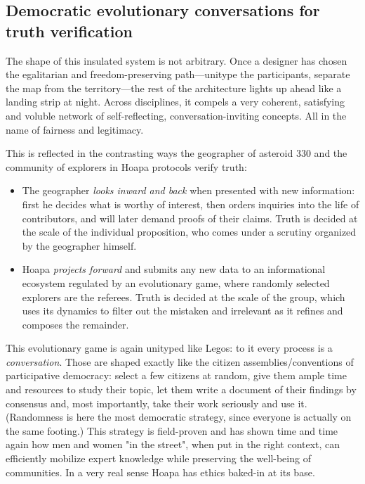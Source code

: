 \documentclass[11pt]{article}
\begin{document}
\subsection{Democratic evolutionary conversations for truth verification}

The shape of this insulated system is not arbitrary. Once a designer has chosen the egalitarian and freedom-preserving path---unitype the participants, separate the map from the territory---the rest of the architecture lights up ahead like a landing strip at night. Across disciplines, it compels a very coherent, satisfying and voluble network of self-reflecting, conversation-inviting concepts. All in the name of fairness and legitimacy.

This is reflected in the contrasting ways the geographer of asteroid 330 and the community of explorers in Hoapa protocols verify truth:

\begin{itemize}

\item The geographer \emph{looks inward and back} when presented with new information: first he decides what is worthy of interest, then orders inquiries into the life of contributors, and will later demand proofs of their claims. Truth is decided at the scale of the individual proposition, who comes under a scrutiny organized by the geographer himself.

\item Hoapa \emph{projects forward} and submits any new data to an informational ecosystem regulated by an evolutionary game, where randomly selected explorers are the referees. Truth is decided at the scale of the group, which uses its dynamics to filter out the mistaken and irrelevant as it refines and composes the remainder.

\end{itemize}

This evolutionary game is again unityped like Legos: to it every process is a \emph{conversation}. Those are shaped exactly like the citizen assemblies/conventions of participative democracy: select a few citizens at random, give them ample time and resources to study their topic, let them write a document of their findings by consensus and, most importantly, take their work seriously and use it. (Randomness is here the most democratic strategy, since everyone is actually on the same footing.) This strategy is field-proven and has shown time and time again how men and women "in the street", when put in the right context, can efficiently mobilize expert knowledge while preserving the well-being of communities. In a very real sense Hoapa has ethics baked-in at its base.
\end{document}

